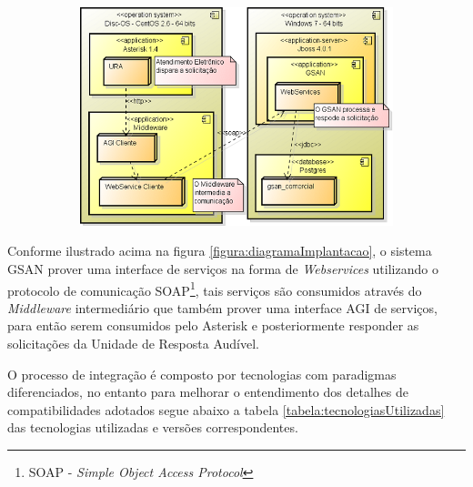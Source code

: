 \begin{figure}[H]
	\centering
	\caption{Diagrama de implantação da solução}
	\label{figura:diagramaImplantacao}
	\begin{subfigure}[H]{\textwidth}
		\centering
		\includegraphics{figuras/diagrama_implantacao.png}
	\end{subfigure}
\end{figure}


Conforme ilustrado acima na figura \ref{figura:diagramaImplantacao}, o sistema GSAN prover uma interface de serviços na forma de \textit{Webservices} utilizando o protocolo de comunicação SOAP\footnote{SOAP - \textit{Simple Object Access Protocol}}, tais serviços são consumidos através do \textit{Middleware} intermediário que também prover uma interface AGI de serviços, para então serem consumidos pelo Asterisk e posteriormente responder as solicitações da Unidade de Resposta Audível.

O processo de integração é composto por tecnologias com paradigmas diferenciados, no entanto para melhorar o entendimento dos detalhes de compatibilidades adotados segue abaixo a tabela \ref{tabela:tecnologiasUtilizadas} das tecnologias utilizadas e versões correspondentes.


